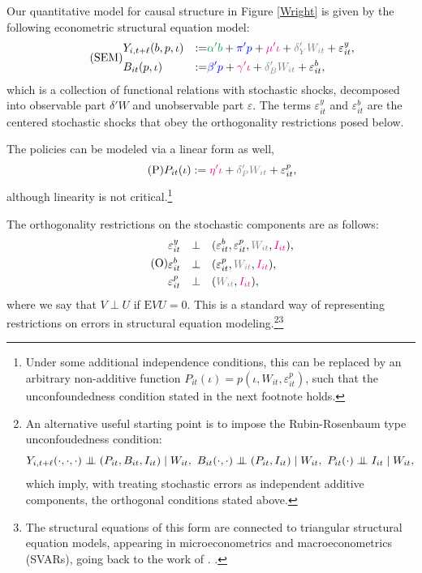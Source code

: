 \documentclass[11pt,reqno,letter]{amsart}
\theoremstyle{definition}
\newcommand\indep{\protect\mathpalette{\protect\independenT}{\perp}}
\def\independenT#1#2{\mathrel{\setbox0\hbox{$#1#2$}%
    \copy0\kern-\wd0\mkern4mu\box0}}
\newcommand{\Ep}{{\mathrm{E}}}
\def\bcolor{\color{ForestGreen}}
\def\pcolor{\color{blue}}
\def\icolor{\color{magenta}}
\def\wcolor{\color{gray}}
\begin{document}
Our quantitative model for causal structure in Figure \ref{Wright} is given by the following econometric structural equation model:\begin{equation} \label{eqn:SEM1} \tag{SEM}
  \begin{aligned}
   &  Y_{i,t+\ell} (b,p,\iota) &:=& {\bcolor \alpha ' b}  +  {\pcolor \pi 'p} +
    {\icolor \mu'\iota } + {\wcolor \delta_Y 'W_{it}} + \varepsilon^y_{it}, \\
   &  B_{it} (p,\iota) &:= & {\pcolor \beta'p } + {\icolor \gamma'\iota} +      {\wcolor\delta_B 'W_{it} } + \varepsilon^b_{it},
      \end{aligned}
 \end{equation}
which is a collection of functional relations with stochastic shocks, decomposed into observable part $\delta' W$ and unobservable part $\varepsilon$.
The terms $\varepsilon^y_{it}$ and  $\varepsilon^b_{it} $  are the centered stochastic shocks that obey the orthogonality restrictions posed below.


The policies can be modeled via a linear form as well,
\begin{equation}\label{eq:Policy} \tag{P}
 P_{it}   (\iota) :=  {\icolor\eta'\iota} + {\wcolor \delta_P' W_{it}} +   \varepsilon^p_{it},   \end{equation}
although  linearity is not critical.\footnote{Under some additional independence conditions, this
can be replaced by an arbitrary non-additive function $P_{it}(\iota) = p (\iota, W_{it},  \varepsilon^p_{it})$, such that the unconfoundedness condition stated in the next footnote holds.}


The orthogonality restrictions on the stochastic components are as follows:
\begin{equation}\label{eqn:SEM2} \tag{O}
\begin{aligned}
   & \varepsilon^y_{it} &  \perp &  \quad (\varepsilon^b_{it}, \varepsilon^p_{it}, {\wcolor W_{it}}, {\icolor I_{it}}), \\
&  \varepsilon^b_{it}  & \perp & \quad  (\varepsilon^p_{it}, {\wcolor W_{it}}, {\icolor I_{it}}), \\
&   \varepsilon^p_{it} &  \perp &  \quad ({\wcolor W_{it}}, {\icolor I_{it}}),
\end{aligned}
\end{equation}
where we say that $V \perp U$ if $\Ep VU = 0$. This is a standard way of representing restrictions on errors in structural equation modeling.\footnote{ An alternative useful
starting point is to impose the Rubin-Rosenbaum type unconfoudedness condition:
$$
Y_{i,t+\ell} (\cdot,\cdot,\cdot)  \indep (P_{it}, B_{it}, I_{it})  \mid W_{it}, \
B_{it} (\cdot,\cdot)  \indep (P_{it}, I_{it})  \mid W_{it}, \
 P_{it} (\cdot)  \indep  I_{it}  \mid W_{it},
$$
which imply, with treating stochastic errors as independent additive components, the orthogonal conditions stated above.
 }\footnote{The structural equations of this form are connected to triangular structural equation models, appearing
 in microeconometrics and macroeconometrics (SVARs), going back to the work of  \cite{strotz1960recursive}. .}
\end{document}
